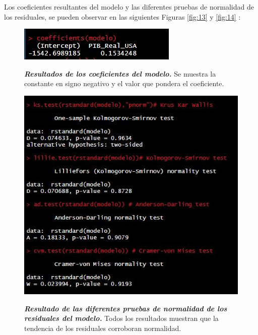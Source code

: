 Los coeficientes resultantes del modelo y las diferentes pruebas de normalidad de los residuales, se pueden observar en las siguientes Figuras \eqref{fig:13} y \eqref{fig:14}  :


\begin{figure}[H]
	\centering
	\resizebox{7 cm}{!} { 
		\includegraphics[width=1\linewidth]{Imagenes/Coeficientes}}
	\caption{\textbf{\textit{Resultados de los coeficientes del modelo.}}
		{\small Se muestra la constante en signo negativo y el valor que pondera el coeficiente.}
	} 
	\label{fig:13}
	
\end{figure}


\begin{figure}[H]
	\centering
	\resizebox{10 cm}{!} { 
		\includegraphics[width=1\linewidth]{Imagenes/Pruebas}}
	\caption{\textbf{\textit{Resultado de las diferentes pruebas de normalidad de los residuales del modelo.}}
		{\small Todos los resultados muestran que la tendencia de los residuales corroboran normalidad.}
	} 
	\label{fig:14}
	
\end{figure}


